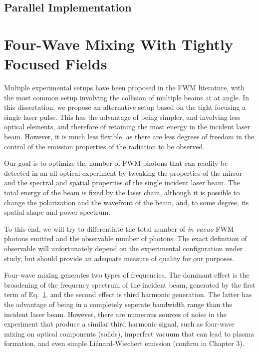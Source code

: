 \documentclass[11pt,SymmetricalJury]{inrsthesis/inrsthesis}
\begin{document}


\subsection{Parallel Implementation}

\section{Four-Wave Mixing With Tightly Focused Fields}

Multiple experimental setups have been proposed in the FWM literature, with the
most common setup involving the collision of multiple beams at at angle. In this
dissertation, we propose an alternative setup based on the tight focusing a
single laser pulse. This has the advantage of being simpler, and involving less
optical elements, and therefore of retaining the most energy in the incident
laser beam. However, it is much less flexible, as there are less degrees of
freedom in the control of the emission properties of the radiation to be
observed.

Our goal is to optimize the number of FWM photons that can readily be detected
in an all-optical experiment by tweaking the properties of the mirror and the
spectral and spatial properties of the single incident laser beam. The total
energy of the beam is fixed by the laser chain, although it is possible to
change the polarization and the wavefront of the beam, and, to some degree, its
spatial shape and power spectrum.

To this end, we will try to differentiate the total number of \textit{in vacuo}
FWM photons emitted and the observable number of photons. The exact definition
of observable will unfortunately depend on the experimental configuration
under study, but should provide an adequate measure of quality for our
purposes. 

Four-wave mixing generates two types of frequencies. The dominant effect
is the broadening of the frequency spectrum of the incident beam, generated
by the first term of Eq.~\ref{}, and the second effect is third harmonic generation.
The latter has the advantage of being in a completely seperate bandwidth range
than the incident laser beam. However, there are numerous sources of noise in the
experiment that produce a similar third harmonic signal, such as four-wave mixing
on optical components (solids), imperfect vacuum that can lead to plasma formation,
and even simple Liénard-Wiechert emission (confirm in Chapter 3).
\end{document}
